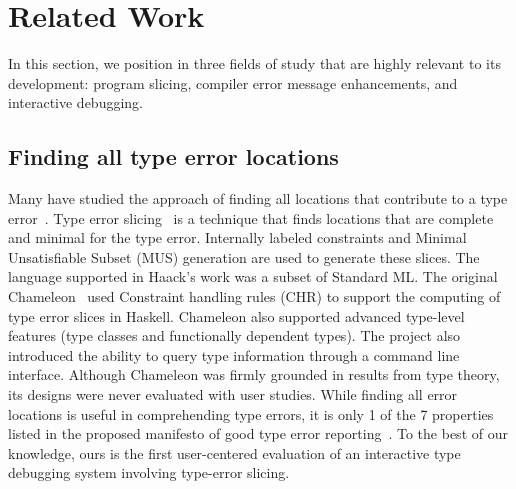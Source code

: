 \section{Related Work}

In this section, we position \chameleon{} in three fields of study that are highly relevant to its development:  program slicing,  compiler error message enhancements, and interactive debugging.  


\subsection{Finding all type error locations}
Many have studied the approach of finding all locations that contribute to a type error~\cite{Stuckey2003-pz, Haack2004-fr, Pavlinovic2015-ke, Schilling2012-iq}. Type error slicing~\cite{Haack2004-fr} is a technique that finds locations that are complete and minimal for the type error. Internally labeled constraints and Minimal Unsatisfiable Subset (MUS) generation are used to generate these slices. The language supported in Haack's work was a subset of Standard ML. The original Chameleon~\cite{Stuckey2003-pz} used  Constraint handling rules (CHR) to support the computing of type error slices in Haskell. Chameleon also supported advanced type-level features (type classes and functionally dependent types). The project also introduced the ability to query type information through a command line interface. Although Chameleon was firmly grounded in results from type theory, its designs were never evaluated with user studies. While finding all error locations is useful in comprehending type errors, it is only 1 of the 7 properties listed in the proposed manifesto of good type error reporting~\cite{Yang2000-wn}.
To the best of our knowledge, ours is the first user-centered evaluation of an interactive type debugging system involving type-error slicing.


